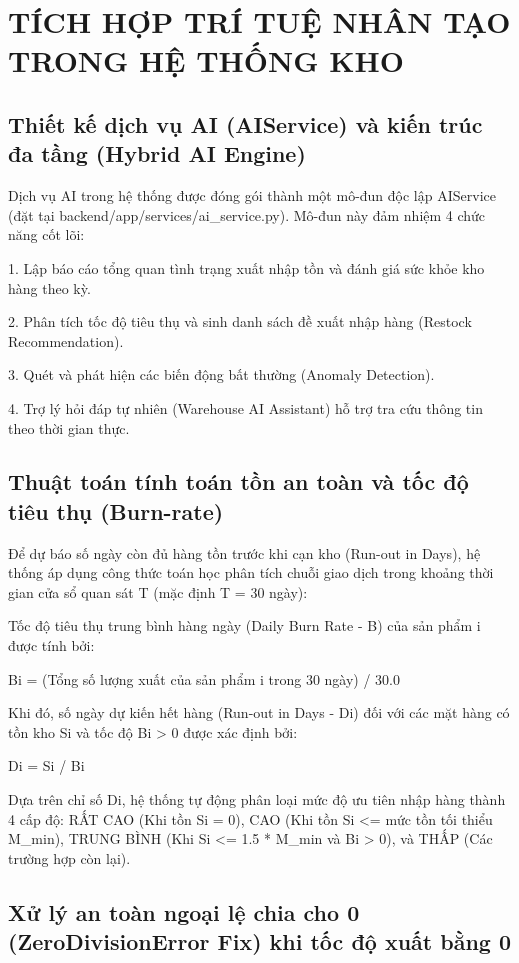 \chapter{TÍCH HỢP TRÍ TUỆ NHÂN TẠO TRONG HỆ THỐNG KHO}

\section{Thiết kế dịch vụ AI (AIService) và kiến trúc đa tầng (Hybrid AI Engine)}

Dịch vụ AI trong hệ thống được đóng gói thành một mô-đun độc lập AIService (đặt tại backend/app/services/ai\_service.py). Mô-đun này đảm nhiệm 4 chức năng cốt lõi:

1. Lập báo cáo tổng quan tình trạng xuất nhập tồn và đánh giá sức khỏe kho hàng theo kỳ.

2. Phân tích tốc độ tiêu thụ và sinh danh sách đề xuất nhập hàng (Restock Recommendation).

3. Quét và phát hiện các biến động bất thường (Anomaly Detection).

4. Trợ lý hỏi đáp tự nhiên (Warehouse AI Assistant) hỗ trợ tra cứu thông tin theo thời gian thực.

\section{Thuật toán tính toán tồn an toàn và tốc độ tiêu thụ (Burn-rate)}

Để dự báo số ngày còn đủ hàng tồn trước khi cạn kho (Run-out in Days), hệ thống áp dụng công thức toán học phân tích chuỗi giao dịch trong khoảng thời gian cửa sổ quan sát T (mặc định T = 30 ngày):

Tốc độ tiêu thụ trung bình hàng ngày (Daily Burn Rate - B) của sản phẩm i được tính bởi:

Bi = (Tổng số lượng xuất của sản phẩm i trong 30 ngày) / 30.0

Khi đó, số ngày dự kiến hết hàng (Run-out in Days - Di) đối với các mặt hàng có tồn kho Si và tốc độ Bi > 0 được xác định bởi:

Di = Si / Bi

Dựa trên chỉ số Di, hệ thống tự động phân loại mức độ ưu tiên nhập hàng thành 4 cấp độ: RẤT CAO (Khi tồn Si = 0), CAO (Khi tồn Si <= mức tồn tối thiểu M\_min), TRUNG BÌNH (Khi Si <= 1.5 * M\_min và Bi > 0), và THẤP (Các trường hợp còn lại).

\section{Xử lý an toàn ngoại lệ chia cho 0 (ZeroDivisionError Fix) khi tốc độ xuất bằng 0}

